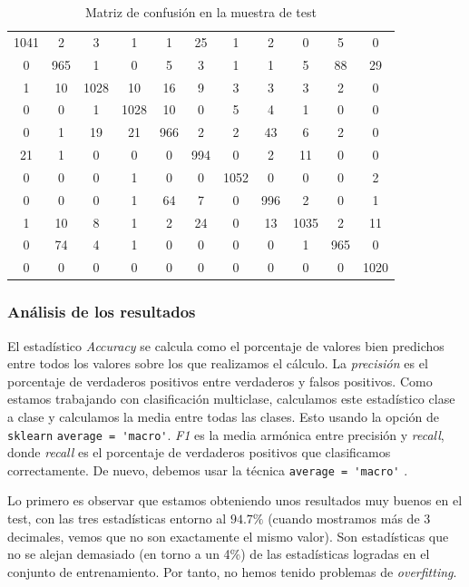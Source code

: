 \documentclass[11pt]{article}
\begin{document}
\begin{table}[H]
\centering
    \begin{tabular}{|c|c|c|c|c|c|c|c|c|c|c|}
    \hline
1041&    2&    3&    1&    1&   25&    1&    2&    0&    5&     0 \\
   0&  965&    1&    0&    5&    3&    1&    1&    5&   88&    29 \\
   1&   10& 1028&   10&   16&    9&    3&    3&    3&    2&     0 \\
   0&    0&    1& 1028&   10&    0&    5&    4&    1&    0&     0 \\
   0&    1&   19&   21&  966&    2&    2&   43&    6&    2&     0 \\
  21&    1&    0&    0&    0&  994&    0&    2&   11&    0&     0 \\
   0&    0&    0&    1&    0&    0& 1052&    0&    0&    0&     2 \\
   0&    0&    0&    1&   64&    7&    0&  996&    2&    0&     1 \\
   1&   10&    8&    1&    2&   24&    0&   13& 1035&    2&    11 \\
   0&   74&    4&    1&    0&    0&    0&    0&    1&  965&     0 \\
   0&    0&    0&    0&    0&    0&    0&    0&    0&    0&  1020 \\
   \hline
\end{tabular}
\caption{Matriz de confusión en la muestra de test}
\end{table}

\subsubsection{Análisis de los resultados}

El estadístico \emph{Accuracy} se calcula como el porcentaje de valores bien predichos entre todos los valores sobre los que realizamos el cálculo. La \emph{precisión} es el porcentaje de verdaderos positivos entre verdaderos y falsos positivos. Como estamos trabajando con clasificación multiclase, calculamos este estadístico clase a clase y calculamos la media entre todas las clases. Esto usando la opción de \lstinline{sklearn} \lstinline{average = 'macro'}. \emph{F1} es la media armónica entre precisión y \emph{recall}, donde \emph{recall} es el porcentaje de verdaderos positivos que clasificamos correctamente. De nuevo, debemos usar la técnica \lstinline{average = 'macro'} \cite{towards_scores:online}.

Lo primero es observar que estamos obteniendo unos resultados muy buenos en el test, con las tres estadísticas entorno al $94.7\%$ (cuando mostramos más de 3 decimales, vemos que no son exactamente el mismo valor). Son estadísticas que no se alejan demasiado (en torno a un 4\%) de las estadísticas logradas en el conjunto de entrenamiento. Por tanto, no hemos tenido problemas de \emph{overfitting}.
\end{document}
